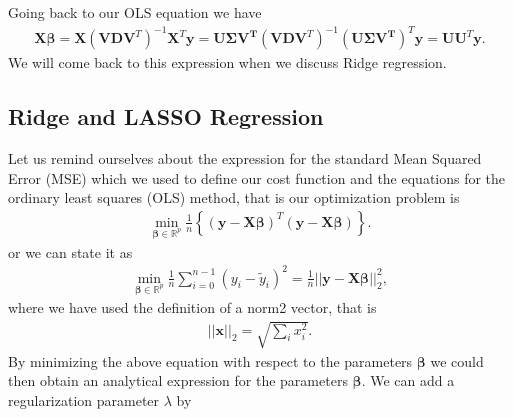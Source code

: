 \documentclass[letterpaper,10pt,english]{sphinxmanual}
\begin{document}
Going back to our OLS equation we have
\begin{equation*}
\begin{split}
\boldsymbol{X}\boldsymbol{\beta} = \boldsymbol{X}\left(\boldsymbol{V}\boldsymbol{D}\boldsymbol{V}^T \right)^{-1}\boldsymbol{X}^T\boldsymbol{y}=\boldsymbol{U\Sigma V^T}\left(\boldsymbol{V}\boldsymbol{D}\boldsymbol{V}^T \right)^{-1}(\boldsymbol{U\Sigma V^T})^T\boldsymbol{y}=\boldsymbol{U}\boldsymbol{U}^T\boldsymbol{y}.
\end{split}
\end{equation*}
We will come back to this expression when we discuss Ridge regression.


\subsection{Ridge and LASSO Regression}
\label{\detokenize{chapter4:ridge-and-lasso-regression}}
Let us remind ourselves about the expression for the standard Mean Squared Error (MSE) which we used to define our cost function and the equations for the ordinary least squares (OLS) method, that is
our optimization problem is
\begin{equation*}
\begin{split}
{\displaystyle \min_{\boldsymbol{\beta}\in {\mathbb{R}}^{p}}}\frac{1}{n}\left\{\left(\boldsymbol{y}-\boldsymbol{X}\boldsymbol{\beta}\right)^T\left(\boldsymbol{y}-\boldsymbol{X}\boldsymbol{\beta}\right)\right\}.
\end{split}
\end{equation*}
or we can state it as
\begin{equation*}
\begin{split}
{\displaystyle \min_{\boldsymbol{\beta}\in
{\mathbb{R}}^{p}}}\frac{1}{n}\sum_{i=0}^{n-1}\left(y_i-\tilde{y}_i\right)^2=\frac{1}{n}\vert\vert \boldsymbol{y}-\boldsymbol{X}\boldsymbol{\beta}\vert\vert_2^2,
\end{split}
\end{equation*}
where we have used the definition of  a norm\sphinxhyphen{}2 vector, that is
\begin{equation*}
\begin{split}
\vert\vert \boldsymbol{x}\vert\vert_2 = \sqrt{\sum_i x_i^2}.
\end{split}
\end{equation*}
By minimizing the above equation with respect to the parameters
\(\boldsymbol{\beta}\) we could then obtain an analytical expression for the
parameters \(\boldsymbol{\beta}\).  We can add a regularization parameter \(\lambda\) by
\end{document}
